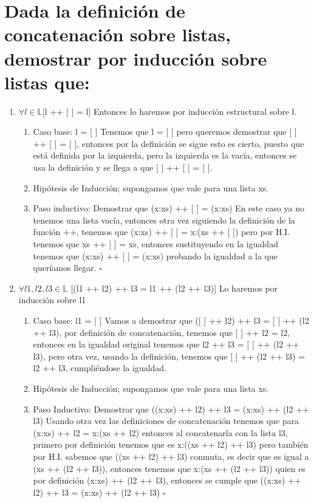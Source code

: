 \documentclass[11pt,letterpaper]{article}
\newcommand*{\QEDB}{\hfill\ensuremath{\square}}%
\begin{document}
\section{Dada la definición de concatenación sobre listas, demostrar por inducción sobre listas que:}
\begin{enumerate}
\item $\forall l \in\mathbb{L}$[l ++ [ ] = l]
Entonces lo haremos por inducción estructural sobre l.
\begin{enumerate}
\item Caso base: l = [ ]
Tenemos que l = [ ] pero queremos demostrar que [ ] ++ [ ] = [ ], entonces por la definición se sigue esto es cierto, puesto que está definida por la izquierda, pero la izquierda es la vacía, entonces se usa la definición y se llega a que [ ] ++ [ ] = [ ].
\item Hipótesis de Inducción; supongamos que vale para una lista xs.
\item Paso inductivo: Demostrar que (x:xs) ++ [ ] = (x:xs)
En este caso ya no tenemos una lista vacía, entonces otra vez siguiendo la definición de la función ++, tenemos que (x:xs) ++ [ ] = x:(xs ++ [ ]) pero por H.I. tenemos que xs ++ [ ] = xs, entonces sustituyendo en la igualdad tenemos que (x:xs) ++ [ ] = (x:xs) probando la igualdad a la que queríamos llegar.
\QEDB
\end{enumerate}
\item $\forall l1, l2, l3 \in\mathbb{L}$ [(l1 ++ l2) ++ l3 = l1 ++ (l2 ++ l3)]
Lo haremos por inducción sobre l1
\begin{enumerate}
\item Caso base: l1 = [ ]
Vamos a demostrar que ([ ] ++ l2) ++ l3 = [ ] ++ (l2 ++ l3), por definición de concatenación, tenemos que [ ] ++ l2 = l2, entonces en la igualdad original tenemos que l2 ++ l3 = [ ] ++ (l2 ++ l3), pero otra vez, usando la definición, tenemos que [ ] ++ (l2 ++ l3) = l2 ++ l3, cumpliéndose la igualdad.
\item Hipótesis de Inducción; supongamos que vale para una lista xs.
\item Paso Inductivo: Demostrar que ((x:xs) ++ l2) ++ l3 = (x:xs) ++ (l2 ++ l3)	
Usando otra vez las definiciones de concatenación tenemos que para (x:xs) ++ l2 = x:(xs ++ l2) entonces al  concatenarla con la lista l3, primero por definición tenemos que es x:((xs ++ l2) ++ l3) pero también por H.I. sabemos que ((xs ++ l2) ++ l3) conmuta, es decir que es igual a (xs ++ (l2 ++ l3)), entonces tenemos que x:(xs ++ (l2 ++ l3)) quien es por definición (x:xs) ++ (l2 ++ l3), entonces se cumple que ((x:xs) ++ l2) ++ l3 = (x:xs) ++ (l2 ++ l3)
\QEDB
\end{enumerate}
\end{enumerate}
\end{document}
